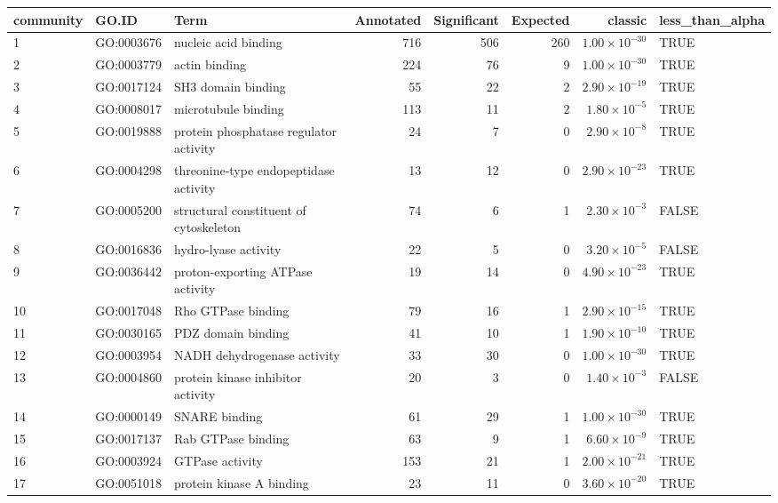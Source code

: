\begin{table}[ht]
\centering
\begin{adjustbox}{max width=\textwidth}
\begin{tabular}{lllrrrrl}
  \hline
community & GO.ID & Term & Annotated & Significant & Expected & classic & less\_than\_alpha \\ 
  \hline
1 & GO:0003676 & nucleic acid binding & 716 & 506 & 260 & $1.00 \times 10^{-30}$ & TRUE \\ 
  2 & GO:0003779 & actin binding & 224 & 76 & 9 & $1.00 \times 10^{-30}$ & TRUE \\ 
  3 & GO:0017124 & SH3 domain binding & 55 & 22 & 2 & $2.90 \times 10^{-19}$ & TRUE \\ 
  4 & GO:0008017 & microtubule binding & 113 & 11 & 2 & $1.80 \times 10^{-5}$ & TRUE \\ 
  5 & GO:0019888 & protein phosphatase regulator activity & 24 & 7 & 0 & $2.90 \times 10^{-8}$ & TRUE \\ 
  6 & GO:0004298 & threonine-type endopeptidase activity & 13 & 12 & 0 & $2.90 \times 10^{-23}$ & TRUE \\ 
  7 & GO:0005200 & structural constituent of cytoskeleton & 74 & 6 & 1 & $2.30 \times 10^{-3}$ & FALSE \\ 
  8 & GO:0016836 & hydro-lyase activity & 22 & 5 & 0 & $3.20 \times 10^{-5}$ & FALSE \\ 
  9 & GO:0036442 & proton-exporting ATPase activity & 19 & 14 & 0 & $4.90 \times 10^{-23}$ & TRUE \\ 
  10 & GO:0017048 & Rho GTPase binding & 79 & 16 & 1 & $2.90 \times 10^{-15}$ & TRUE \\ 
  11 & GO:0030165 & PDZ domain binding & 41 & 10 & 1 & $1.90 \times 10^{-10}$ & TRUE \\ 
  12 & GO:0003954 & NADH dehydrogenase activity & 33 & 30 & 0 & $1.00 \times 10^{-30}$ & TRUE \\ 
  13 & GO:0004860 & protein kinase inhibitor activity & 20 & 3 & 0 & $1.40 \times 10^{-3}$ & FALSE \\ 
  14 & GO:0000149 & SNARE binding & 61 & 29 & 1 & $1.00 \times 10^{-30}$ & TRUE \\ 
  15 & GO:0017137 & Rab GTPase binding & 63 & 9 & 1 & $6.60 \times 10^{-9}$ & TRUE \\ 
  16 & GO:0003924 & GTPase activity & 153 & 21 & 1 & $2.00 \times 10^{-21}$ & TRUE \\ 
  17 & GO:0051018 & protein kinase A binding & 23 & 11 & 0 & $3.60 \times 10^{-20}$ & TRUE \\ 

\end{tabular}
\end{adjustbox}
\end{table}
